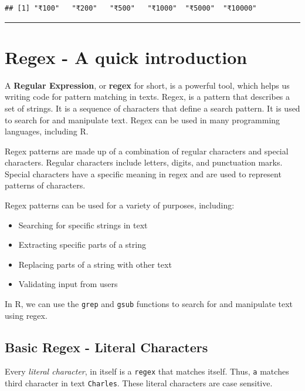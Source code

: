 \documentclass[
]{book}
\providecommand{\tightlist}{%
  \setlength{\itemsep}{0pt}\setlength{\parskip}{0pt}}
\begin{document}
\begin{verbatim}
## [1] "₹100"   "₹200"   "₹500"   "₹1000"  "₹5000"  "₹10000"
\end{verbatim}

\begin{center}\rule{0.5\linewidth}{0.5pt}\end{center}

\hypertarget{regex---a-quick-introduction}{%
\chapter{Regex - A quick introduction}\label{regex---a-quick-introduction}}

A \textbf{Regular Expression}, or \textbf{regex} for short, is a powerful tool, which helps us writing code for pattern matching in texts. Regex, is a pattern that describes a set of strings. It is a sequence of characters that define a search pattern. It is used to search for and manipulate text. Regex can be used in many programming languages, including R.

Regex patterns are made up of a combination of regular characters and special characters. Regular characters include letters, digits, and punctuation marks. Special characters have a specific meaning in regex and are used to represent patterns of characters.

Regex patterns can be used for a variety of purposes, including:

\begin{itemize}
\tightlist
\item
  Searching for specific strings in text
\item
  Extracting specific parts of a string
\item
  Replacing parts of a string with other text
\item
  Validating input from users
\end{itemize}

In R, we can use the \texttt{grep} and \texttt{gsub} functions to search for and manipulate text using regex.

\hypertarget{basic-regex---literal-characters}{%
\section{Basic Regex - Literal Characters}\label{basic-regex---literal-characters}}

Every \emph{literal character}, in itself is a \texttt{regex} that matches itself. Thus, \texttt{a} matches third character in text \texttt{Charles}. These literal characters are case sensitive.
\end{document}
